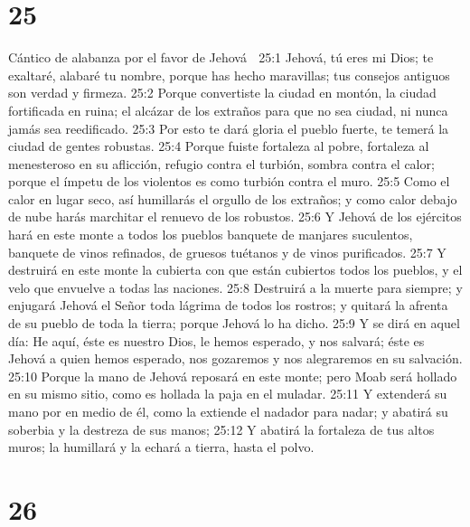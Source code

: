 \chapter{25}

Cántico de alabanza por el favor de Jehová  

25:1 Jehová, tú eres mi Dios; te exaltaré, alabaré tu nombre, porque has hecho maravillas; tus consejos antiguos son verdad y firmeza.  
25:2 Porque convertiste la ciudad en montón, la ciudad fortificada en ruina; el alcázar de los extraños para que no sea ciudad, ni nunca jamás sea reedificado.  
25:3 Por esto te dará gloria el pueblo fuerte, te temerá la ciudad de gentes robustas. 
25:4 Porque fuiste fortaleza al pobre, fortaleza al menesteroso en su aflicción, refugio contra el turbión, sombra contra el calor; porque el ímpetu de los violentos es como turbión contra el muro.  
25:5 Como el calor en lugar seco, así humillarás el orgullo de los extraños; y como calor debajo de nube harás marchitar el renuevo de los robustos.  
25:6 Y Jehová de los ejércitos hará en este monte a todos los pueblos banquete de manjares suculentos, banquete de vinos refinados, de gruesos tuétanos y de vinos purificados.  
25:7 Y destruirá en este monte la cubierta con que están cubiertos todos los pueblos, y el velo que envuelve a todas las naciones.  
25:8 Destruirá a la muerte para siempre; y enjugará Jehová el Señor toda lágrima de todos los rostros; y quitará la afrenta de su pueblo de toda la tierra; porque Jehová lo ha dicho.  
25:9 Y se dirá en aquel día: He aquí, éste es nuestro Dios, le hemos esperado, y nos salvará; éste es Jehová a quien hemos esperado, nos gozaremos y nos alegraremos en su salvación.  
25:10 Porque la mano de Jehová reposará en este monte; pero Moab será hollado en su mismo sitio, como es hollada la paja en el muladar.  
25:11 Y extenderá su mano por en medio de él, como la extiende el nadador para nadar; y abatirá su soberbia y la destreza de sus manos;  
25:12 Y abatirá la fortaleza de tus altos muros; la humillará y la echará a tierra, hasta el polvo.  

\chapter{26}

